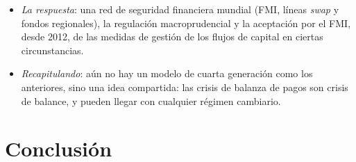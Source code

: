 \documentclass[11pt]{article}
\begin{document}
\begin{itemize}
\item \emph{La respuesta}: una red de seguridad financiera mundial (FMI, líneas \emph{swap} y fondos regionales), la regulación macroprudencial  y la aceptación por el FMI, desde 2012, de las medidas de gestión de los flujos de capital en ciertas circunstancias\nocite{FMI2012VisionInstitucional}.
\item \emph{Recapitulando}: aún no hay un modelo de cuarta generación como los anteriores, sino una idea compartida: las crisis de balanza de pagos son crisis de balance, y pueden llegar con cualquier régimen cambiario.
\end{itemize}

\section*{Conclusión}
\end{document}
